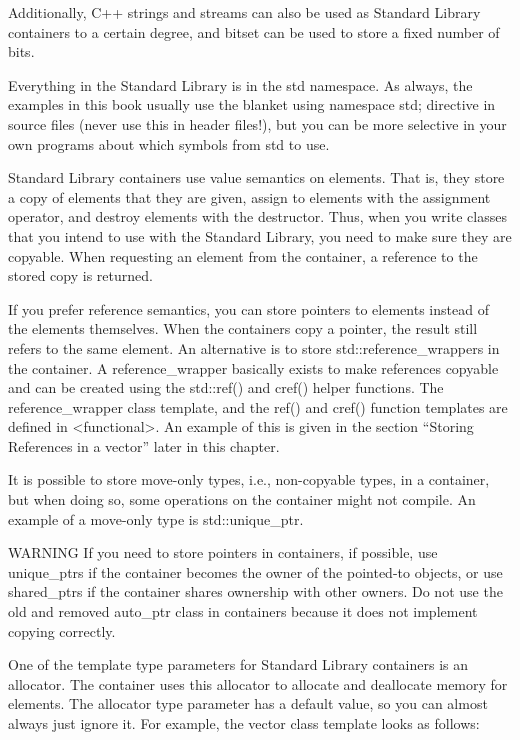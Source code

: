 Additionally, C++ strings and streams can also be used as Standard Library containers to a certain degree, and bitset can be used to store a fixed number of bits.

Everything in the Standard Library is in the std namespace. As always, the examples in this book usually use the blanket using namespace std; directive in source files (never use this in header files!), but you can be more selective in your own programs about which symbols from std to use.


Standard Library containers use value semantics on elements. That is, they store a copy of elements that they are given, assign to elements with the assignment operator, and destroy elements with the destructor. Thus, when you write classes that you intend to use with the Standard Library, you need to make sure they are copyable. When requesting an element from the container, a reference to the stored copy is returned.

If you prefer reference semantics, you can store pointers to elements instead of the elements themselves. When the containers copy a pointer, the result still refers to the same element. An alternative is to store std::reference\_wrappers in the container. A reference\_wrapper basically exists to make references copyable and can be created using the std::ref() and cref() helper functions. The reference\_wrapper class template, and the ref() and cref() function templates are defined in <functional>. An example of this is given in the section “Storing References in a vector” later in this chapter.

It is possible to store move-only types, i.e., non-copyable types, in a container, but when doing so, some operations on the container might not compile. An example of a move-only type is std::unique\_ptr.

\begin{myWarning}{WARNING}
If you need to store pointers in containers, if possible, use unique\_ptrs if the container becomes the owner of the pointed-to objects, or use shared\_ptrs if the container shares ownership with other owners. Do not use the old and removed auto\_ptr class in containers because it does not implement copying correctly.
\end{myWarning}

One of the template type parameters for Standard Library containers is an allocator. The container uses this allocator to allocate and deallocate memory for elements. The allocator type parameter has a default value, so you can almost always just ignore it. For example, the vector class template looks as follows:

